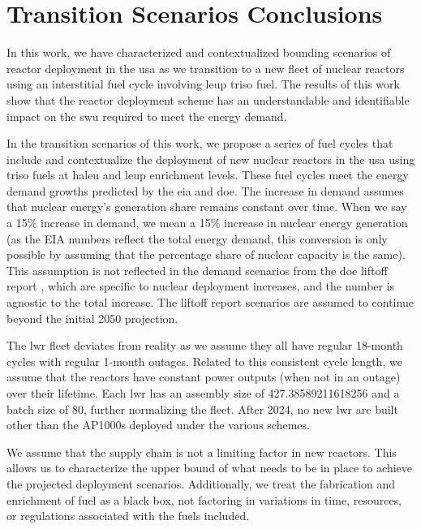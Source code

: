 \section{Transition Scenarios Conclusions}
\label{sec:dep_conc}

In this work, we have characterized and contextualized bounding scenarios of reactor deployment in the \gls{usa} as we transition to a new fleet of nuclear reactors using an interstitial fuel cycle involving \gls{leup} \gls{triso} fuel. The results of this work show that the reactor deployment scheme has an understandable and identifiable impact on the \gls{swu} required to meet the energy demand.

In the transition scenarios of this work, we propose a series of fuel cycles that include and contextualize the deployment of new nuclear reactors in the \gls{usa} using \gls{triso} fuels at \gls{haleu} and \gls{leup} enrichment levels. These fuel cycles meet the energy demand growths predicted by the \gls{eia} and \gls{doe}. The increase in demand assumes that nuclear energy's generation share remains constant over time. When we say a 15$\%$ increase in demand, we mean a 15$\%$ increase in nuclear energy generation (as the EIA numbers \cite{eia_aeo_2023} reflect the total energy demand, this conversion is only possible by assuming that the percentage share of nuclear capacity is the same). This assumption is not reflected in the demand scenarios from the \gls{doe} liftoff report \cite{julie_liftoff_pathways_2024}, which are specific to nuclear deployment increases, and the number is agnostic to the total increase. The liftoff report scenarios are assumed to continue beyond the initial 2050 projection.

The \gls{lwr} fleet deviates from reality as we assume they all have regular 18-month cycles with regular 1-month outages. Related to this consistent cycle length, we assume that the reactors have constant power outputs (when not in an outage) over their lifetime. Each \gls{lwr} has an assembly size of 427.38589211618256 and a batch size of 80,  further normalizing the fleet. After 2024, no new \gls{lwr} are built other than the AP1000s deployed under the various schemes.

We assume that the supply chain is not a limiting factor in new reactors. This allows us to characterize the upper bound of what needs to be in place to achieve the projected deployment scenarios. Additionally, we treat the fabrication and enrichment of fuel as a black box, not factoring in variations in time, resources, or regulations associated with the fuels included.


